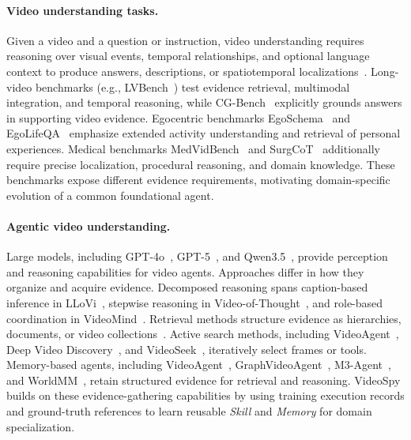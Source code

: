 \documentclass{article} %
\begin{document}
\paragraph{Video understanding tasks.}
Given a video and a question or instruction, video understanding requires reasoning over visual events, temporal relationships, and optional language context to produce answers, descriptions, or spatiotemporal localizations~\citep{li2024mvbench,ren2024timechat,huang2024lita,wang2026surgcot,fu2025videomme,wu2024longvideobench}. Long-video benchmarks (e.g., LVBench~\citep{wang2025lvbench}) test evidence retrieval, multimodal integration, and temporal reasoning, while CG-Bench~\citep{chen2025cgbench} explicitly grounds answers in supporting video evidence. Egocentric benchmarks EgoSchema~\citep{mangalam2023egoschema} and EgoLifeQA~\citep{yang2025egolife} emphasize extended activity understanding and retrieval of personal experiences. Medical benchmarks MedVidBench~\citep{su2026medgrpo} and SurgCoT~\citep{wang2026surgcot} additionally require precise localization, procedural reasoning, and domain knowledge. These benchmarks expose different evidence requirements, motivating domain-specific evolution of a common foundational agent.

\paragraph{Agentic video understanding.}
Large models, including GPT-4o~\citep{openai2024gpt4o}, GPT-5~\citep{openai2025gpt5}, and Qwen3.5~\citep{qwenteam2026qwen35}, provide perception and reasoning capabilities for video agents. Approaches differ in how they organize and acquire evidence. Decomposed reasoning spans caption-based inference in LLoVi~\citep{zhang2024llovi}, stepwise reasoning in Video-of-Thought~\citep{fei2024videoofthought}, and role-based coordination in VideoMind~\citep{liu2026videomind}. Retrieval methods structure evidence as hierarchies, documents, or video collections~\citep{wang2025videotree,ma2025drvideo}. Active search methods, including VideoAgent~\citep{wang2025videoagent}, Deep Video Discovery~\citep{zhang2025dvd}, and VideoSeek~\citep{lin2026videoseek}, iteratively select frames or tools. Memory-based agents, including VideoAgent~\citep{fan2025videoagent}, GraphVideoAgent~\citep{chu2025graphvideoagent}, M3-Agent~\citep{long2026m3agent}, and WorldMM~\citep{yeo2026worldmm}, retain structured evidence for retrieval and reasoning. VideoSpy builds on these evidence-gathering capabilities by using training execution records and ground-truth references to learn reusable \textit{Skill} and \textit{Memory} for domain specialization.
\end{document}
